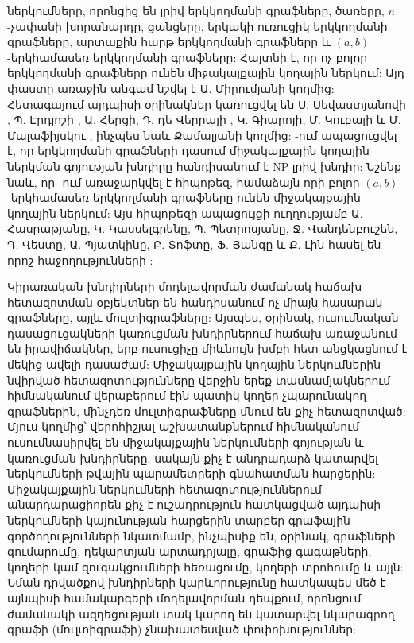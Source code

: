 ներկումները, որոնցից են լրիվ երկկողմանի գրաֆները, ծառերը, $n$-չափանի խորանարդը, ցանցերը, երկակի ուռուցիկ երկկողմանի գրաֆները, արտաքին հարթ երկկողմանի գրաֆները և $(a,b)$-երկհամասեռ երկկողմանի գրաֆները: Հայտնի է, որ ոչ բոլոր երկկողմանի գրաֆները ունեն միջակայքային կողային ներկում: Այդ փաստը առաջին անգամ նշվել է Ա. Միրումյանի կողմից: Հետագայում այդպիսի օրինակներ կառուցվել են Ս. Սեվաստյանովի \cite{Sevastyanov1990}, Պ. Էրդյոշի \cite{JensenToft1995}, Ա. Հերցի, Դ. դե Վերրայի \cite{GiaroKubaleMalafiejski1999,JensenToft1995}, Կ. Գիարոյի, Մ. Կուբալի և Մ. Մալաֆիյսկու \cite{GiaroKubaleMalafiejski1999}, ինչպես նաև Քամալյանի \cite{Kamalian2010} կողմից: \cite{Sevastyanov1990}-ում ապացուցվել է, որ երկկողմանի գրաֆների դասում միջակայքային կողային ներկման գոյության խնդիրը հանդիսանում է NP-լրիվ խնդիր: Նշենք նաև, որ \cite{JensenToft1995}-ում առաջարկվել է հիպոթեզ, համաձայն որի բոլոր $(a,b)$-երկհամասեռ երկկողմանի գրաֆները ունեն միջակայքային կողային ներկում: Այս հիպոթեզի ապացույցի ուղղությամբ Ա. Հասրաթյանը, Կ. Կասսելգրենը, Պ. Պետրոսյանը, Ջ. Վանդենբուշեն, Դ. Վեստը, Ա. Պյատկինը, Բ. Տոֆտը, Ֆ. Յանգը և Ք. Լին հասել են որոշ հաջողությունների \cite{AsratianCasselgrenPetrosyan2017,AsratianCasselgrenVandenbusscheWest2009,CasselgrenPetrosyanToft2017,CarlJToft,Pyatkin2004,YangLi2011}:

Կիրառական խնդիրների մոդելավորման ժամանակ հաճախ հետազոտման օբյեկտներ են հանդիսանում ոչ միայն հասարակ գրաֆները, այլև մուլտիգրաֆները: Այսպես, օրինակ, ուսումնական դասացուցակների կառուցման խնդիրներում հաճախ առաջանում են իրավիճակներ, երբ ուսուցիչը միևնույն խմբի հետ անցկացնում է մեկից ավելի դասաժամ: Միջակայքային կողային ներկումներին նվիրված հետազոտությունները վերջին երեք տասնամյակներում հիմնականում վերաբերում էին պատիկ կողեր չպարունակող գրաֆներին, մինչդեռ մուլտիգրաֆները մնում են քիչ հետազոտված: Մյուս կողմից՝ վերոհիշյալ աշխատանքներում հիմնականում ուսումնասիրվել են միջակայքային ներկումների գոյության և կառուցման խնդիրները, սակայն քիչ է անդրադարձ կատարվել ներկումների թվային պարամետրերի գնահատման հարցերին: Միջակայքային ներկումների հետազոտություններում անարդարացիորեն քիչ է ուշադրություն հատկացված այդպիսի ներկումների կայունության հարցերին տարբեր գրաֆային գործողությունների նկատմամբ, ինչպիսիք են, օրինակ, գրաֆների գումարումը, դեկարտյան արտադրյալը, գրաֆից գագաթների, կողերի կամ զուգակցումների հեռացումը, կողերի տրոհումը և այլն: Նման դրվածքով խնդիրների կարևորությունը հատկապես մեծ է այնպիսի համակարգերի մոդելավորման դեպքում, որոնցում ժամանակի ազդեցության տակ կարող են կատարվել նկարագրող գրաֆի (մուլտիգրաֆի) չնախատեսված փոփոխություններ:



